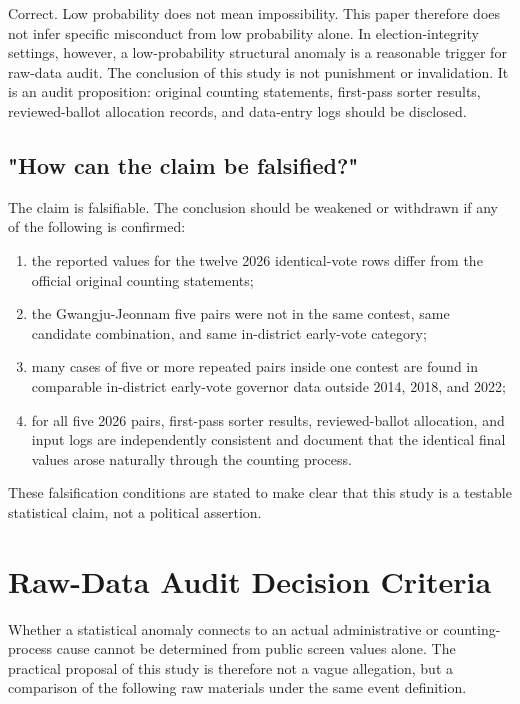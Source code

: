 \documentclass[preprint]{IEIE}
\begin{document}
Correct. Low probability does not mean impossibility. This paper therefore does not infer specific misconduct from low probability alone. In election-integrity settings, however, a low-probability structural anomaly is a reasonable trigger for raw-data audit. The conclusion of this study is not punishment or invalidation. It is an audit proposition: original counting statements, first-pass sorter results, reviewed-ballot allocation records, and data-entry logs should be disclosed.

\subsection{"How can the claim be falsified?"}

The claim is falsifiable. The conclusion should be weakened or withdrawn if any of the following is confirmed:

\begin{enumerate}
\item the reported values for the twelve 2026 identical-vote rows differ from the official original counting statements;
\item the Gwangju-Jeonnam five pairs were not in the same contest, same candidate combination, and same in-district early-vote category;
\item many cases of five or more repeated pairs inside one contest are found in comparable in-district early-vote governor data outside 2014, 2018, and 2022;
\item for all five 2026 pairs, first-pass sorter results, reviewed-ballot allocation, and input logs are independently consistent and document that the identical final values arose naturally through the counting process.
\end{enumerate}

These falsification conditions are stated to make clear that this study is a testable statistical claim, not a political assertion.

\section{Raw-Data Audit Decision Criteria}

Whether a statistical anomaly connects to an actual administrative or counting-process cause cannot be determined from public screen values alone. The practical proposal of this study is therefore not a vague allegation, but a comparison of the following raw materials under the same event definition.
\end{document}
